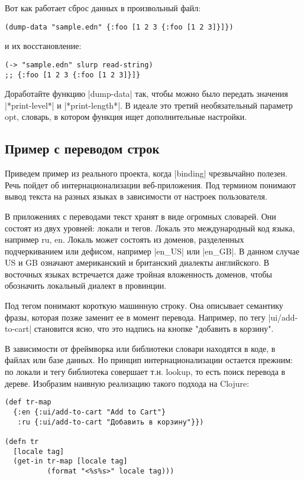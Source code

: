 Вот как работает сброс данных в произвольный файл:

\begin{verbatim}
(dump-data "sample.edn" {:foo [1 2 3 {:foo [1 2 3]}]})
\end{verbatim}

и их восстановление:

\begin{verbatim}
(-> "sample.edn" slurp read-string)
;; {:foo [1 2 3 {:foo [1 2 3]}]}
\end{verbatim}

Доработайте функцию \spverb|dump-data| так, чтобы можно было передать значения
\spverb|*print-level*| и \spverb|*print-length*|. В идеале это третий необязательный параметр
opt, словарь, в котором функция ищет дополнительные настройки.

\subsection{Пример с переводом строк}

Приведем пример из реального проекта, когда \spverb|binding| чрезвычайно полезен. Речь
пойдет об интернационализации веб-приложения. Под термином понимают вывод текста
на разных языках в зависимости от настроек пользователя.

В приложениях с переводами текст хранят в виде огромных словарей. Они состоят из
двух уровней: локали и тегов. Локаль это международный код языка, например ru,
en. Локаль может состоять из доменов, разделенных подчеркиванием или дефисом,
например \spverb|en_US| или \spverb|en_GB|. В данном случае US и GB означают американский и
британский диалекты английского. В восточных языках встречается даже тройная
вложенность доменов, чтобы обозначить локальный диалект в провинции.

Под тегом понимают короткую машинную строку. Она описывает семантику фразы,
которая позже заменит ее в момент перевода. Например, по тегу \spverb|ui/add-to-cart|
становится ясно, что это надпись на кнопке "добавить в корзину".

В зависимости от фреймворка или библиотеки словари находятся в коде, в файлах
или базе данных. Но принцип интернационализации остается прежним: по локали и
тегу библиотека совершает т.н. lookup, то есть поиск перевода в
дереве. Изобразим наивную реализацию такого подхода на Clojure:

\begin{verbatim}
(def tr-map
  {:en {:ui/add-to-cart "Add to Cart"}
   :ru {:ui/add-to-cart "Добавить в корзину"}})

(defn tr
  [locale tag]
  (get-in tr-map [locale tag]
          (format "<%s%s>" locale tag)))
\end{verbatim}

